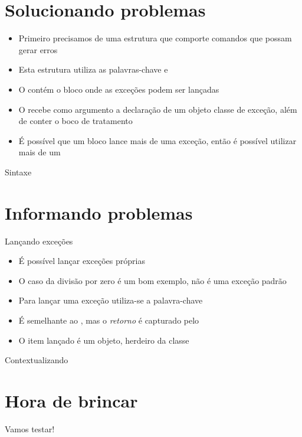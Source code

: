 \documentclass[14pt]{beamer}
\begin{document}
	\section{Solucionando problemas}
		\begin{frame}
			\begin{itemize}
				\presentationPause\item Primeiro precisamos de uma estrutura que comporte comandos que possam gerar erros
				\presentationPause\item Esta estrutura utiliza as palavras-chave  e 
				\presentationPause\item O  contém o bloco onde as exceções podem ser lançadas
				\presentationPause\item O  recebe como argumento a declaração de um objeto classe de exceção\presentationPause, além de conter o boco de tratamento
				\presentationPause\item É possível que um bloco lance mais de uma exceção\presentationPause, então é possível utilizar mais de um 
			\end{itemize}
		\end{frame}

		\begin{frame}{Sintaxe}
			\presentationPause
		\end{frame}

	\section{Informando problemas}
		\begin{frame}{Lançando exceções}
			\begin{itemize}
				\presentationPause\item É possível lançar exceções próprias
				\presentationPause\item O caso da divisão por zero é um bom exemplo\presentationPause, não é uma exceção padrão
				\presentationPause\item Para lançar uma exceção utiliza-se a palavra-chave \basicCode{throw}
				\presentationPause\item É semelhante ao \presentationPause, mas o \textit{retorno} é capturado pelo \basicCode{try}
				\presentationPause\item O item lançado é um objeto\presentationPause, herdeiro da classe \basicCode{exception}
			\end{itemize}
			\presentationPause
		\end{frame}

		\begin{frame}{Contextualizando}
			\begin{multicols}{2}
				\presentationPause
			\end{multicols}
		\end{frame}

	\section{Hora de brincar}
		\begin{frame}
			\begin{center}\Huge
				Vamos testar!
			\end{center}
		\end{frame}
	
\end{document}
